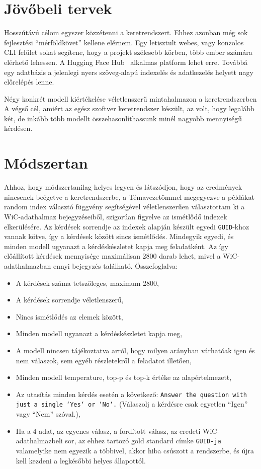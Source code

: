 \documentclass[12pt]{report}
\begin{document}
    \section{Jövőbeli tervek}
    Hosszútávú célom egyszer közzétenni a keretrendszert.
    Ehhez azonban még sok fejlesztési ``mérföldkövet'' kellene elérnem.
    Egy letisztult webes, vagy konzolos CLI felület sokat segítene, hogy a projekt szélesebb körben, több ember számára elérhető lehessen.
    A Hugging Face Hub~\cite{huggingfacehub} alkalmas platform lehet erre.
    Továbbá egy adatbázis a jelenlegi nyers szöveg-alapú indexelés és adatkezelés helyett nagy előrelépés lenne.

    {Négy konkrét modell kiértékelése véletlenszerű mintahalmazon a keretrendszerben}
    A végső cél, amiért az egész szoftver keretrendszer készült, az volt, hogy legalább két, de inkább több modellt összehasonlíthassunk minél nagyobb mennyiségű kérdésen.

    \section{Módszertan}
    Ahhoz, hogy módszertanilag helyes legyen és látszódjon, hogy az eredmények nincsenek beégetve a keretrendszerbe, a Témavezetőmmel megegyezve a példákat random index választó függvény segítségével véletlenszerűen választottam ki a WiC-adathalmaz bejegyzéseiből, szigorúan figyelve az ismétlődő indexek elkerülésére.
    Az kérdések sorrendje az indexek alapján készült egyedi \texttt{\allowbreak GUID}-khoz vannak kötve, így a kérdések között sincs ismétlődés. Mindegyik egyedi, és minden modell ugyanazt a kérdéskészletet kapja meg feladatként. Az így előállított kérdések mennyisége maximálisan 2800 darab lehet, mivel a WiC-adathalmazban ennyi bejegyzés található.
    Összefoglalva:
    \begin{itemize}
        \item A kérdések száma tetszőleges, maximum 2800,
        \item A kérdések sorrendje véletlenszerű,
        \item Nincs ismétlődés az elemek között,
        \item Minden modell ugyanazt a kérdéskészletet kapja meg,
        \item A modell nincsen tájékoztatva arról, hogy milyen arányban várhatóak igen és nem válaszok, sem egyéb részletekről a feladatot illetően,
        \item Minden modell temperature, top-p és top-k értéke az alapértelmezett,
        \item Az utasítás minden kérdés esetén a következő: \texttt{\allowbreak Answer the question with just a single `Yes` or `No`.} (Válaszolj a kérdésre csak egyetlen ``Igen'' vagy ``Nem'' szóval.),
        \item Ha a 4 adat, az egyenes válasz, a fordított válasz, az eredeti WiC-adathalmazbeli sor, az ehhez tartozó gold standard címke \texttt{GUID-ja} valamelyike nem egyezik a többivel, akkor hiba csúszott a rendszerbe, és újra kell kezdeni a legkésőbbi helyes állapottól.
    \end{itemize}
\end{document}
